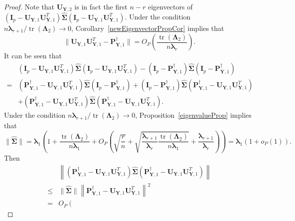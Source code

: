 \documentclass[12pt]{article} %
\DeclareMathOperator{\mytr}{tr}
\newcommand{\bP}{\mathbf{P}}
\newcommand{\bY}{\mathbf{Y}}
\newcommand{\bI}{\mathbf{I}}
\newcommand{\bU}{\mathbf{U}}
\newcommand{\bfsym}[1]{\ensuremath{\boldsymbol{#1}}}
\def\blambda {\bfsym {\lambda}}
\def\bLambda {\bfsym {\Lambda}}
\def\bSigma {\bfsym {\Sigma}}
\theoremstyle{definition}
\begin{document}
\begin{appendices}
\begin{proof}
    Note that $\bU_{\bY,2}$ is in fact the first $n-r$ eigenvectors of $(\bI_p -\bU_{\bY,1}\bU_{\bY,1}^T)\hat{\bSigma}(\bI_p -\bU_{\bY,1}\bU_{\bY,1}^T)$.
    Under the condition $n\blambda_{r+1}/\mytr(\bLambda_2)\to 0$,
    Corollary~\ref{newEigenvectorPropCor} implies that 
    \begin{equation*}
        \|\bU_{\bY,1}\bU_{\bY,1}^T - 
\bP^\dagger_{\bY,1}
        \|
    =O_P\left(\frac{\mytr(\bLambda_2)}{n\blambda_r}\right).
    \end{equation*}
    It can be seen that
    \begin{equation*}
        \begin{split}
             &(\bI_p -\bU_{\bY,1}\bU_{\bY,1}^T)\hat{\bSigma}(\bI_p -\bU_{\bY,1}\bU_{\bY,1}^T)
             -
             (\bI_p -\bP^\dagger_{\bY,1})\hat{\bSigma}(\bI_p-\bP^\dagger_{\bY,1})
             \\
             =&
             (\bP^\dagger_{\bY,1}-\bU_{\bY,1}\bU_{\bY,1}^T)\hat{\bSigma}(\bI_p-\bP^\dagger_{\bY,1})
             +(\bI_p-\bP^\dagger_{\bY,1})\hat{\bSigma}(\bP^\dagger_{\bY,1}-\bU_{\bY,1}\bU_{\bY,1}^T)
             \\
             &+
             (\bP^\dagger_{\bY,1}-\bU_{\bY,1}\bU_{\bY,1}^T)\hat{\bSigma}(\bP^\dagger_{\bY,1}-\bU_{\bY,1}\bU_{\bY,1}^T).
        \end{split}
    \end{equation*}
    Under the condition $n\blambda_{r+1}/\mytr(\bLambda_2)\to 0$, Proposition~\ref{eigenvalueProp} implies that
    \begin{equation*}
        \|\hat{\bSigma}\|
        =\blambda_1\left(
            1+\frac{\mytr(\bLambda_2)}{n\blambda_1}+O_P\left(\sqrt{\frac{r}{n}}+\sqrt{\frac{\blambda_{r+1}}{\blambda_r}\frac{\mytr(\bLambda_2)}{n\blambda_1}}+\frac{\blambda_{r+1}}{\blambda_r}\right)
        \right)
        =\blambda_1(1+o_P(1)).
    \end{equation*}
     Then
     \begin{equation}\label{aiBound1}
        \begin{split}
             &\left\|
             (\bP^\dagger_{\bY,1}-\bU_{\bY,1}\bU_{\bY,1}^T)\hat{\bSigma}(\bP^\dagger_{\bY,1}-\bU_{\bY,1}\bU_{\bY,1}^T)
             \right\|
             \\
             \leq&
             \|\hat{\bSigma}\|
             \left\|
             \bP^\dagger_{\bY,1}-\bU_{\bY,1}\bU_{\bY,1}^T
             \right\|^2
             \\
                 =&
            O_P
                \left(

\end{split}
\end{equation}
\end{proof}
\end{appendices}
\end{document}
